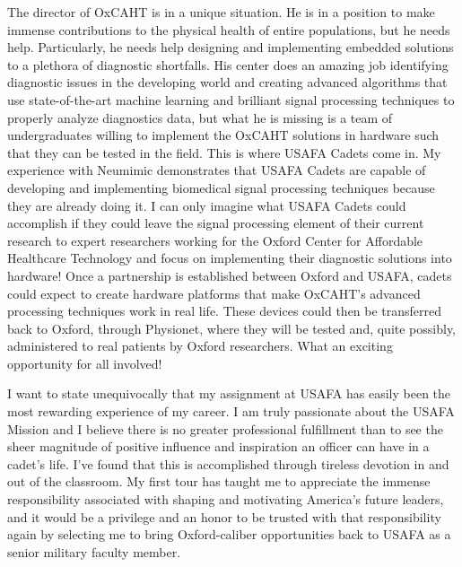 \documentclass{article}
\begin{document}
The director of OxCAHT is in a unique situation. He is in a position to make
immense contributions to the physical health of entire populations, but he needs
help. Particularly, he needs help designing and implementing embedded solutions
to a plethora of diagnostic shortfalls. His center does an amazing job
identifying diagnostic issues in the developing world and creating advanced algorithms that use
state-of-the-art machine learning and brilliant signal processing techniques to
properly analyze diagnostics data, but what he is missing is a team of
undergraduates willing to implement the OxCAHT solutions in hardware such that
they can be tested in the field. This is where USAFA Cadets come in. My experience with 
Neumimic demonstrates that USAFA Cadets are capable of developing and implementing biomedical 
signal processing techniques because they are already doing it. I can only
imagine what USAFA Cadets could accomplish if they could leave the signal processing element
of their current research to expert researchers working for the Oxford Center 
for Affordable Healthcare Technology and focus on implementing their diagnostic 
solutions into hardware! Once a partnership is established between Oxford and USAFA,
cadets could expect to create hardware platforms that make OxCAHT's advanced processing techniques
work in real life. These devices could then be transferred back to Oxford, through Physionet,
where they will be tested and, quite possibly, administered to real patients by Oxford researchers.
What an exciting opportunity for all involved!
 
I want to state unequivocally that my assignment at USAFA has easily been the
most rewarding experience of my career. I am truly passionate about the USAFA
Mission and I believe there is no greater professional fulfillment than to see
the sheer magnitude of positive influence and inspiration an officer can have
in a cadet's life. I've found that this is accomplished through tireless
devotion in and out of the classroom. My first tour has taught me to appreciate
the immense responsibility associated with shaping and motivating America's
future leaders, and it would be a privilege and an honor to be trusted with
that responsibility again by selecting me to bring Oxford-caliber opportunities
back to USAFA as a senior military faculty member.
 
\end{document}

